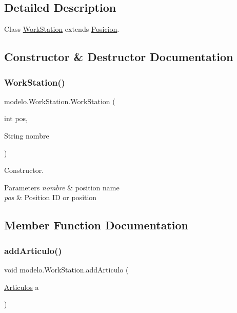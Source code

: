 \subsection{Detailed Description}
Class \mbox{\hyperlink{classmodelo_1_1_work_station}{Work\+Station}} extends \mbox{\hyperlink{classmodelo_1_1_posicion}{Posicion}}. 

\subsection{Constructor \& Destructor Documentation}
\mbox{\label{classmodelo_1_1_work_station_a04df345e4feea6715d7aafda01ed54cc}} 
\subsubsection{\texorpdfstring{Work\+Station()}{WorkStation()}}
{\footnotesize\ttfamily modelo.\+Work\+Station.\+Work\+Station (\begin{DoxyParamCaption}\item[{int}]{pos,  }\item[{String}]{nombre }\end{DoxyParamCaption})}



Constructor. 


\begin{DoxyParams}{Parameters}
{\em nombre} & position name \\
\hline
{\em pos} & Position ID or position \\
\hline
\end{DoxyParams}


\subsection{Member Function Documentation}
\mbox{\label{classmodelo_1_1_work_station_a1d36e29aba2a6d03a918eb87d724c839}} 
\subsubsection{\texorpdfstring{add\+Articulo()}{addArticulo()}}
{\footnotesize\ttfamily void modelo.\+Work\+Station.\+add\+Articulo (\begin{DoxyParamCaption}\item[{\mbox{\hyperlink{classmodelo_1_1_articulos}{Articulos}}}]{a }\end{DoxyParamCaption})}



